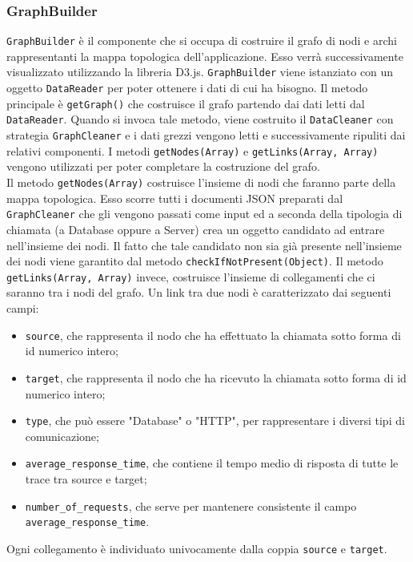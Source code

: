 \subsubsection{GraphBuilder}
\label{sec:GraphBuilder}
	\texttt{GraphBuilder} è il componente che si occupa di costruire il grafo di nodi e archi rappresentanti la mappa topologica dell'applicazione. Esso verrà successivamente visualizzato utilizzando la libreria D3.js. \texttt{GraphBuilder} viene istanziato con un oggetto \texttt{DataReader} per poter ottenere i dati di cui ha bisogno.
	Il metodo principale è \texttt{getGraph()} che costruisce il grafo partendo dai dati letti dal \texttt{DataReader}. Quando si invoca tale metodo, viene costruito il \texttt{DataCleaner} con strategia \texttt{GraphCleaner} e i dati grezzi vengono letti e successivamente ripuliti dai relativi componenti.
	I metodi \texttt{getNodes(Array)} e \texttt{getLinks(Array, Array)} vengono utilizzati per poter completare la costruzione del grafo.\\
	Il metodo \texttt{getNodes(Array)} costruisce l'insieme di nodi che faranno parte della mappa topologica. Esso scorre tutti i documenti JSON preparati dal \texttt{GraphCleaner} che gli vengono passati come input ed a seconda della tipologia di chiamata (a Database oppure a Server) crea un oggetto candidato ad entrare nell'insieme dei nodi. Il fatto che tale candidato non sia già presente nell'insieme dei nodi viene garantito dal metodo \texttt{checkIfNotPresent(Object)}.
	Il metodo \texttt{getLinks(Array, Array)} invece, costruisce l'insieme di collegamenti che ci saranno tra i nodi del grafo. Un link tra due nodi è caratterizzato dai seguenti campi:
	\begin{itemize}
		\item{\texttt{source}, che rappresenta il nodo che ha effettuato la chiamata sotto forma di id numerico intero;}
		\item{\texttt{target}, che rappresenta il nodo che ha ricevuto la chiamata sotto forma di id numerico intero;}
		\item{\texttt{type}, che può essere "Database" o "HTTP", per rappresentare i diversi tipi di comunicazione;}
		\item{\texttt{average\_response\_time}, che contiene il tempo medio di risposta di tutte le trace tra source e target;}
		\item{\texttt{number\_of\_requests}, che serve per mantenere consistente il campo \texttt{average\_response\_time}.}
	\end{itemize}
	Ogni collegamento è individuato univocamente dalla coppia \texttt{source} e \texttt{target}.
